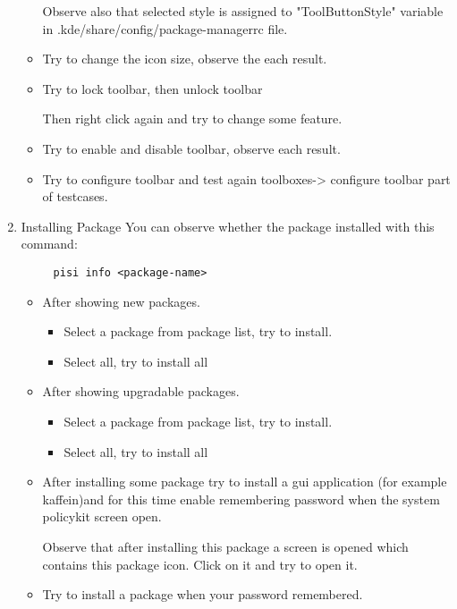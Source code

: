 \documentclass[a4paper,10pt]{article}
\begin{document}
\begin{enumerate}
\begin{itemize}
            Observe also that selected style is assigned to "ToolButtonStyle" variable in .kde/share/config/package-managerrc file.
        \item Try to change the icon size, observe the each result.
        \item Try to lock toolbar, then unlock toolbar
    
            Then right click again and try to change some feature.
        \item Try to enable and disable toolbar, observe each result.
        \item Try to configure toolbar and test again toolboxes-> configure toolbar part of testcases.
    \end{itemize}
    \item Installing Package
	You can observe whether the package installed with this command:
	\begin{verbatim}
	 pisi info <package-name>
	\end{verbatim}

        \begin{itemize}
            \item After showing new packages. 
            \begin{itemize}
                \item Select a package from package list, try to install.
                \item Select all, try to install all
            \end{itemize}
            \item After showing upgradable packages.
            \begin{itemize}
                \item Select a package from package list, try to install.
                \item Select all, try to install all
            \end{itemize}
	\item After installing some package try to install a gui application (for example kaffein)and for this time enable remembering password when the system policykit screen open.
		
		Observe that after installing this package a screen is opened which contains this package icon. Click on it and try to open it.
	\item Try to install a package when your password remembered.
		

\end{itemize}
\end{enumerate}
\end{document}
